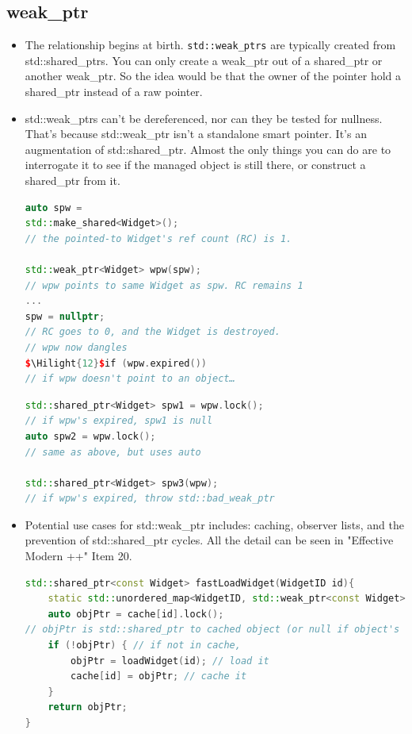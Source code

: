 \documentclass[a4paper,12pt,twoside]{book}
\newcommand{\Hilight}[1]{\makebox[0pt][l]{\color{yellow}\rule[-3pt]{#1em}{11pt}}}
\begin{document}
\subsection{weak\_ptr}
\begin{itemize}

\item The relationship begins at birth. \texttt{std::weak\_ptrs} are typically created from std::shared\_ptrs. You can only create a weak\_ptr out of a shared\_ptr or another weak\_ptr. So the idea would be that the owner of the pointer hold a shared\_ptr instead of a raw pointer.


\item std::weak\_ptrs can't be dereferenced, nor can they be tested for nullness. That's because std::weak\_ptr isn't a standalone smart pointer. It's an augmentation of std::shared\_ptr. Almost the only things you can do are to interrogate it to see if the managed object is still there, or construct a shared\_ptr from it.

\begin{lstlisting}[frame=single, language=c++,mathescape=true]
auto spw =
std::make_shared<Widget>();
// the pointed-to Widget's ref count (RC) is 1.

std::weak_ptr<Widget> wpw(spw);
// wpw points to same Widget as spw. RC remains 1
...
spw = nullptr;
// RC goes to 0, and the Widget is destroyed.
// wpw now dangles
$\Hilight{12}$if (wpw.expired())
// if wpw doesn't point to an object…
\end{lstlisting}

\begin{lstlisting}[frame=single, language=c++,mathescape=true]
std::shared_ptr<Widget> spw1 = wpw.lock();
// if wpw's expired, spw1 is null
auto spw2 = wpw.lock();
// same as above, but uses auto

std::shared_ptr<Widget> spw3(wpw);
// if wpw's expired, throw std::bad_weak_ptr
\end{lstlisting}


\item Potential use cases for std::weak\_ptr includes: caching, observer lists, and the prevention of std::shared\_ptr cycles.  All the detail can be seen in "Effective Modern ++" Item 20.
\begin{lstlisting}[frame=single, language=c++]
std::shared_ptr<const Widget> fastLoadWidget(WidgetID id){
	static std::unordered_map<WidgetID, std::weak_ptr<const Widget>> cache;
	auto objPtr = cache[id].lock();
// objPtr is std::shared_ptr to cached object (or null if object's not in cache)
	if (!objPtr) { // if not in cache,
		objPtr = loadWidget(id); // load it
		cache[id] = objPtr; // cache it
	}
	return objPtr;
}
\end{lstlisting}


\end{itemize}
\end{document}
